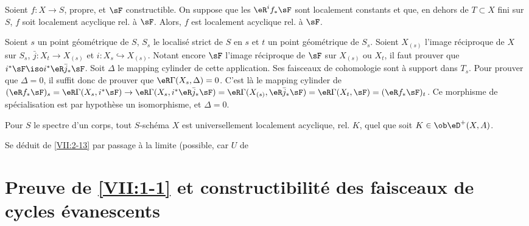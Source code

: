 \begin{lemma_}\label{VII:2-15}
Soient $f:X\to S$, propre, et $\sF$ constructible. On suppose que les 
$\eR^i f_\ast \sF$ sont localement constants et que, en dehors de $T\subset X$ 
fini sur $S$, $f$ soit localement acyclique rel. à $\sF$. Alors, $f$ est 
localement acyclique rel. à $\sF$. 
\end{lemma_}

Soient $s$ un point géométrique de $S$, $S_s$ le localisé strict de $S$ 
en $s$ et $t$ un point géométrique de $S_s$. Soient $X_{(s)}$ l'image 
réciproque de $X$ sur $S_s$, $\bar j:X_t \to X_{(s)}$ et 
$i:X_s \hookrightarrow X_{(s)}$. Notant encore $\sF$ l'image réciproque de 
$\sF$ sur $X_{(s)}$ ou $X_t$, il faut prouver que 
$i^\ast \sF \iso i^\ast \eR \bar j_\ast \sF$. Soit $\Delta$ le mapping cylinder 
de cette application. Ses faisceaux de cohomologie sont à support dans $T_s$. 
Pour prouver que $\Delta=0$, il suffit donc de prouver que 
$\eR\Gamma(X_s,\Delta)=0$. C'est là le mapping cylinder de 
$(\eR f_\ast \sF)_s = \eR\Gamma(X_s,i^\ast \sF) \to \eR\Gamma(X_s,i^\ast \eR\bar j_\ast \sF) = \eR\Gamma(X_{(s)},\eR\bar j_\ast \sF) = \eR\Gamma(X_t,\sF) = (\eR f_\ast \sF)_t$. 
Ce morphisme de spécialisation est par hypothèse un isomorphisme, et 
$\Delta=0$. 





\begin{corollary_}\label{VII:2-16}
Pour $S$ le spectre d'un corps, tout $S$-schéma $X$ est universellement 
localement acyclique, rel. $K$, quel que soit $K\in\ob\eD^+(X,A)$. 
\end{corollary_}

Se déduit de \ref{VII:2-13} par passage à la limite (possible, car $U$ de 










\section{Preuve de \texorpdfstring{\ref{VII:1-1}}{1.1} et constructibilité des faisceaux de cycles évanescents}\label{VII:3}





\subsection{}\label{VII:3-1}

